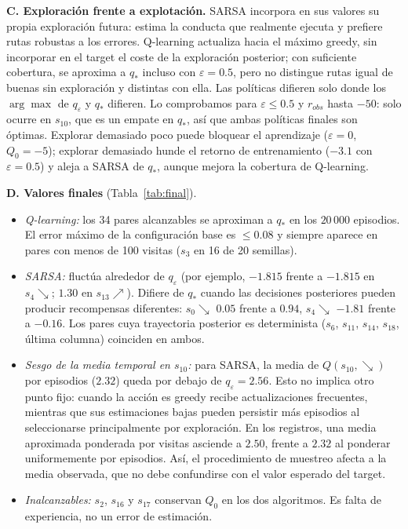 \documentclass[11pt,a4paper]{article}
\newcommand{\UR}{{\nearrow}}
\newcommand{\DR}{{\searrow}}
\newcommand{\qe}{q_\varepsilon}
\begin{document}
\textbf{C. Exploración frente a explotación.} SARSA incorpora en sus valores su propia exploración futura: estima la conducta que realmente ejecuta y prefiere rutas robustas a los errores. Q-learning actualiza hacia el máximo greedy, sin incorporar en el target el coste de la exploración posterior; con suficiente cobertura, se aproxima a $q_*$ incluso con $\varepsilon=0.5$, pero no distingue rutas igual de buenas sin exploración y distintas con ella. Las políticas difieren solo donde los $\arg\max$ de $\qe$ y $q_*$ difieren. Lo comprobamos para $\varepsilon\le0.5$ y $r_{obs}$ hasta $-50$: solo ocurre en $s_{10}$, que es un empate en $q_*$, así que ambas políticas finales son óptimas. Explorar demasiado poco puede bloquear el aprendizaje ($\varepsilon=0$, $Q_0=-5$); explorar demasiado hunde el retorno de entrenamiento ($-3.1$ con $\varepsilon=0.5$) y aleja a SARSA de $q_*$, aunque mejora la cobertura de Q-learning.



\textbf{D. Valores finales} (Tabla~\ref{tab:final}).

\begin{itemize}\itemsep0pt

\item \emph{Q-learning:} los 34 pares alcanzables se aproximan a $q_*$ en los $20\,000$ episodios. El error máximo de la configuración base es $\le0.08$ y siempre aparece en pares con menos de 100 visitas ($s_3$ en 16 de 20 semillas).

\item \emph{SARSA:} fluctúa alrededor de $\qe$ (por ejemplo, $-1.815$ frente a $-1.815$ en $s_4\DR$; $1.30$ en $s_{13}\UR$). Difiere de $q_*$ cuando las decisiones posteriores pueden producir recompensas diferentes: $s_0\DR$ $0.05$ frente a $0.94$, $s_4\DR$ $-1.81$ frente a $-0.16$. Los pares cuya trayectoria posterior es determinista ($s_6$, $s_{11}$, $s_{14}$, $s_{18}$, última columna) coinciden en ambos.

\item \emph{Sesgo de la media temporal en $s_{10}$:} para SARSA, la media de $Q(s_{10},\DR)$ por episodios ($2.32$) queda por debajo de $\qe=2.56$. Esto no implica otro punto fijo: cuando la acción es greedy recibe actualizaciones frecuentes, mientras que sus estimaciones bajas pueden persistir más episodios al seleccionarse principalmente por exploración. En los registros, una media aproximada ponderada por visitas asciende a $2.50$, frente a $2.32$ al ponderar uniformemente por episodios. Así, el procedimiento de muestreo afecta a la media observada, que no debe confundirse con el valor esperado del target.

\item \emph{Inalcanzables:} $s_2$, $s_{16}$ y $s_{17}$ conservan $Q_0$ en los dos algoritmos. Es falta de experiencia, no un error de estimación.

\end{itemize}
\end{document}

